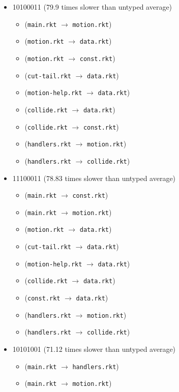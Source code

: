 \documentclass{article}
\newcommand{\mono}[1]{\texttt{#1}}
\begin{document}
\begin{itemize}
\begin{itemize}
  \end{itemize}
\item 10100011 (79.9 times slower than untyped average)
  \begin{itemize}
  \item (\mono{main.rkt} $\rightarrow$ \mono{motion.rkt})
  \item (\mono{motion.rkt} $\rightarrow$ \mono{data.rkt})
  \item (\mono{motion.rkt} $\rightarrow$ \mono{const.rkt})
  \item (\mono{cut-tail.rkt} $\rightarrow$ \mono{data.rkt})
  \item (\mono{motion-help.rkt} $\rightarrow$ \mono{data.rkt})
  \item (\mono{collide.rkt} $\rightarrow$ \mono{data.rkt})
  \item (\mono{collide.rkt} $\rightarrow$ \mono{const.rkt})
  \item (\mono{handlers.rkt} $\rightarrow$ \mono{motion.rkt})
  \item (\mono{handlers.rkt} $\rightarrow$ \mono{collide.rkt})
  \end{itemize}
\item 11100011 (78.83 times slower than untyped average)
  \begin{itemize}
  \item (\mono{main.rkt} $\rightarrow$ \mono{const.rkt})
  \item (\mono{main.rkt} $\rightarrow$ \mono{motion.rkt})
  \item (\mono{motion.rkt} $\rightarrow$ \mono{data.rkt})
  \item (\mono{cut-tail.rkt} $\rightarrow$ \mono{data.rkt})
  \item (\mono{motion-help.rkt} $\rightarrow$ \mono{data.rkt})
  \item (\mono{collide.rkt} $\rightarrow$ \mono{data.rkt})
  \item (\mono{const.rkt} $\rightarrow$ \mono{data.rkt})
  \item (\mono{handlers.rkt} $\rightarrow$ \mono{motion.rkt})
  \item (\mono{handlers.rkt} $\rightarrow$ \mono{collide.rkt})
  \end{itemize}
\item 10101001 (71.12 times slower than untyped average)
  \begin{itemize}
  \item (\mono{main.rkt} $\rightarrow$ \mono{handlers.rkt})
  \item (\mono{main.rkt} $\rightarrow$ \mono{motion.rkt})

\end{itemize}
\end{itemize}
\end{document}
